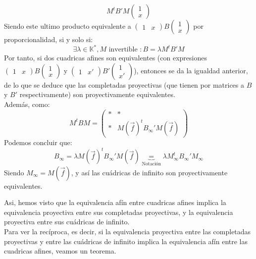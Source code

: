 \begin{definición}
\[    M^t
    B'
    M
    \begin{pmatrix}
        1 \\
        x
    \end{pmatrix}
    \]
    Siendo este ultimo producto equivalente a $\begin{pmatrix} 1 & x \end{pmatrix} B \begin{pmatrix} 1 \\ x \end{pmatrix}$ por proporcionalidad, si y solo si:
    \[
    \exists \lambda \in \mathbb{K}^*, M \text{ invertible } : B = \lambda M^t B' M
    \]
    Por tanto, si dos cuadricas afines son equivalentes (con expresiones $\begin{pmatrix} 1 & x \end{pmatrix} B \begin{pmatrix} 1 \\ x \end{pmatrix}$ y $\begin{pmatrix} 1 & x' \end{pmatrix} B' \begin{pmatrix} 1 \\ x' \end{pmatrix}$), entonces se da la igualdad anterior, de lo que se deduce que las completadas proyectivas (que tienen por matrices a $B$ y $B'$ respectivamente) son proyectivamente equivalentes.\\
    Además, como:
    \[
    M^t B M =
    \left(
        \begin{array}{c|c}
            * & * \\
            \hline
            * & M(\vec{f})^t B_\infty' M(\vec{f})
        \end{array}
    \right)
    \]
    Podemos concluir que:
    \[
    B_\infty = 
    \lambda M(\vec{f})^t B_\infty' M(\vec{f}) 
    \underbrace{=}_{\text{Notación}}
    \lambda M_\infty^t B_\infty' M_\infty
    \]
    Siendo $M_\infty = M(\vec{f})$, y así las cuádricas de infinito son proyectivamente equivalentes.
\end{definición}

Asi, hemos visto que la equivalencia afín entre cuadricas afines implica la equivalencia proyectiva entre sus completadas proyectivas, y la equivalencia proyectiva entre sus cuádricas de infinito.\\

Para ver la recíproca, es decir, si la equivalencia proyectiva entre las completadas proyectivas y entre las cuádricas de infinito implica la equivalencia afín entre las cuadricas afines, veamos un teorema.

